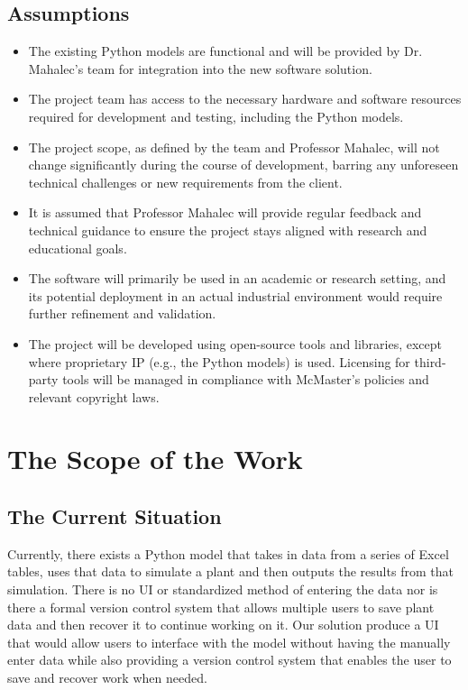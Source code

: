 \documentclass[12pt]{article}
\begin{document}
\subsection{Assumptions}
\begin{itemize}
    \item The existing Python models are functional and will be provided by Dr. Mahalec’s team for integration into the new software solution.
    \item The project team has access to the necessary hardware and software resources required for development and testing, including the Python models.
    \item The project scope, as defined by the team and Professor Mahalec, will not change significantly during the course of development, barring any unforeseen technical challenges or new requirements from the client.
    \item It is assumed that Professor Mahalec will provide regular feedback and technical guidance to ensure the project stays aligned with research and educational goals.
    \item The software will primarily be used in an academic or research setting, and its potential deployment in an actual industrial environment would require further refinement and validation.
    \item The project will be developed using open-source tools and libraries, except where proprietary IP (e.g., the Python models) is used. Licensing for third-party tools will be managed in compliance with McMaster’s policies and relevant copyright laws. 
\end{itemize}

\section{The Scope of the Work}
\subsection{The Current Situation}
Currently, there exists a Python model that takes in data from a series of Excel tables, uses that data to simulate a plant and then outputs the results from that simulation. There is no UI or standardized method of entering the data nor is there a formal version control system that allows multiple users to save plant data and then recover it to continue working on it. Our solution produce a UI that would allow users to interface with the model without having the manually enter data while also providing a version control system that enables the user to save and recover work when needed. 
\end{document}
